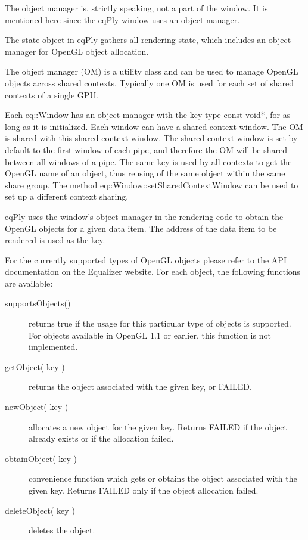 \documentclass[10pt,a4]{scrartcl}
\begin{document}
The object manager is, strictly speaking, not a part of the window. It
is mentioned here since the \textsf{eqPly} window uses an object manager.

The state object in \textsf{eqPly} gathers all rendering state, which
includes an object manager for OpenGL object allocation. 

The object manager (OM) is a utility class and can be used to manage OpenGL
objects across shared contexts. Typically one OM is used for each set of shared
contexts of a single GPU.

Each \textsf{eq::Window} has an object manager with the key type \textsf{const
  void*}, for as long as it is initialized. Each window can have a shared
context window. The OM is shared with this shared context window. The shared
context window is set by default to the first window of each pipe, and therefore
the OM will be shared between all windows of a pipe. The same key is used by all
contexts to get the OpenGL name of an object, thus reusing of the same object
within the same share group.  The method
\textsf{eq::Window::setSharedContextWindow} can be used to set up a different
context sharing.

\textsf{eqPly} uses the window's object manager in the rendering code to
obtain the OpenGL objects for a given data item. The address of the data
item to be rendered is used as the key.

For the currently supported types of OpenGL objects please refer to the
API documentation on the Equalizer website. For each object, the
following functions are available:

\begin{description}
\item[supportsObjects()] returns true if the usage for this particular
  type of objects is supported. For objects available in OpenGL 1.1 or
  earlier, this function is not implemented.
\item[getObject( key )] returns the object associated with the given
  key, or FAILED.
\item[newObject( key )] allocates a new object for the given
  key. Returns FAILED if the object already exists or if the allocation
  failed.
\item[obtainObject( key )] convenience function which gets or obtains
  the object associated with the given key. Returns FAILED only if the
  object allocation failed.
\item[deleteObject( key )] deletes the object.
\end{description}
\end{document}
